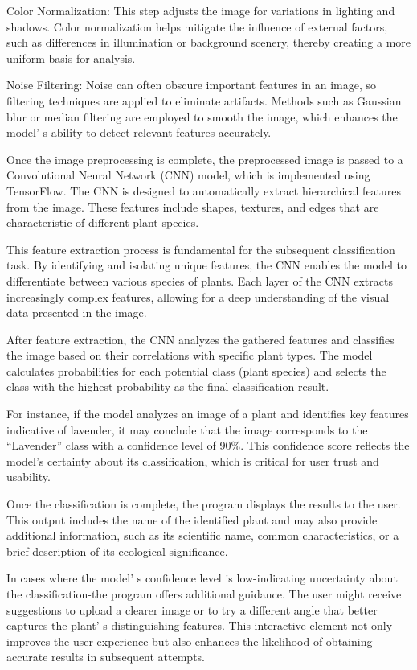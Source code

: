 {{Color Normalization: This step adjusts the image for variations in
lighting and shadows. Color normalization helps mitigate the influence
of external factors, such as differences in illumination or background
scenery, thereby creating a more uniform basis for analysis.

Noise Filtering: Noise can often obscure important features in an image,
so filtering techniques are applied to eliminate artifacts. Methods such
as Gaussian blur or median filtering are employed to smooth the image,
which enhances the model' s ability to detect relevant
features accurately.

Once the image preprocessing is complete, the preprocessed image is
passed to a Convolutional Neural Network (CNN) model, which is
implemented using TensorFlow. The CNN is designed to automatically
extract hierarchical features from the image. These features include
shapes, textures, and edges that are characteristic of different plant
species.

This feature extraction process is fundamental for the subsequent
classification task. By identifying and isolating unique features, the
CNN enables the model to differentiate between various species of
plants. Each layer of the CNN extracts increasingly complex features,
allowing for a deep understanding of the visual data presented in the
image.

After feature extraction, the CNN analyzes the gathered features and
classifies the image based on their correlations with specific plant
types. The model calculates probabilities for each potential class
(plant species) and selects the class with the highest probability as
the final classification result.

For instance, if the model analyzes an image of a plant and identifies
key features indicative of lavender, it may conclude that the image
corresponds to the ``Lavender'' class with a confidence level of 90\%.
This confidence score reflects the model's certainty about its
classification, which is critical for user trust and usability.

Once the classification is complete, the program displays the results to
the user. This output includes the name of the identified plant and may
also provide additional information, such as its scientific name, common
characteristics, or a brief description of its ecological significance.

In cases where the model' s confidence level is
low-indicating uncertainty about the classification-the program offers
additional guidance. The user might receive suggestions to upload a
clearer image or to try a different angle that better captures the
plant' s distinguishing features. This interactive
element not only improves the user experience but also enhances the
likelihood of obtaining accurate results in subsequent attempts.

}}
